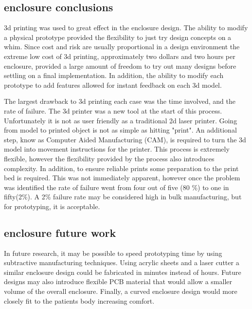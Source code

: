 \subsection{enclosure conclusions}
3d printing was used to great effect in the enclosure design. The ability to modify a physical prototype provided the flexibility to just try design concepts on a whim. Since cost and risk are usually proportional in a design environment the extreme low cost of 3d printing, approximately two dollars and two hours per enclosure, provided a large amount of freedom to try out many designs before settling on a final implementation. In addition, the ability to modify each prototype to add features allowed for instant feedback on each 3d model. 

The largest drawback to 3d printing each case was the time involved, and the rate of failure. The 3d printer was a new tool at the start of this process. Unfortunately it is not as user friendly as a traditional 2d laser printer. Going from model to printed object is not as simple as hitting "print". An additional step, know as Computer Aided Manufacturing (CAM), is required to turn the 3d model into movement instructions for the printer. This process is extremely flexible, however the flexibility provided by the process also introduces complexity. In addition, to ensure reliable prints some preparation to the print bed is required. This was not immediately apparent, however once the problem was identified the rate of failure went from four out of five (80 \%) to one in fifty(2\%). A 2\% failure rate may be considered high in bulk manufacturing, but for prototyping, it is acceptable.

\subsection{enclosure future work}
In future research, it may be possible to speed prototyping time by using subtractive manufacturing techniques. Using acrylic sheets and a laser cutter a similar enclosure design could be fabricated in minutes instead of hours. Future designs may also introduce flexible PCB material that would allow a smaller volume of the overall enclosure. Finally, a curved enclosure design would more closely fit to the patients body increasing comfort.
